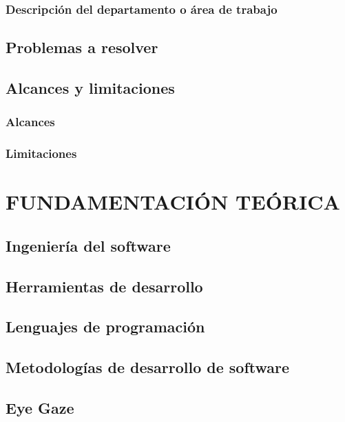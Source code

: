 \documentclass[12pt]{book} %
\begin{document}
	
	\subsection{Descripción del departamento o área de trabajo}

\newpage
\section{Problemas a resolver}

\newpage
\section{Alcances y limitaciones}
	\subsection{Alcances}
	\subsection{Limitaciones}




\chapter{FUNDAMENTACIÓN TEÓRICA}
\thispagestyle{empty}

\section{Ingeniería del software}

\section{Herramientas de desarrollo}

\section{Lenguajes de programación}

\section{Metodologías de desarrollo de software}

\section{Eye Gaze }
\end{document}
